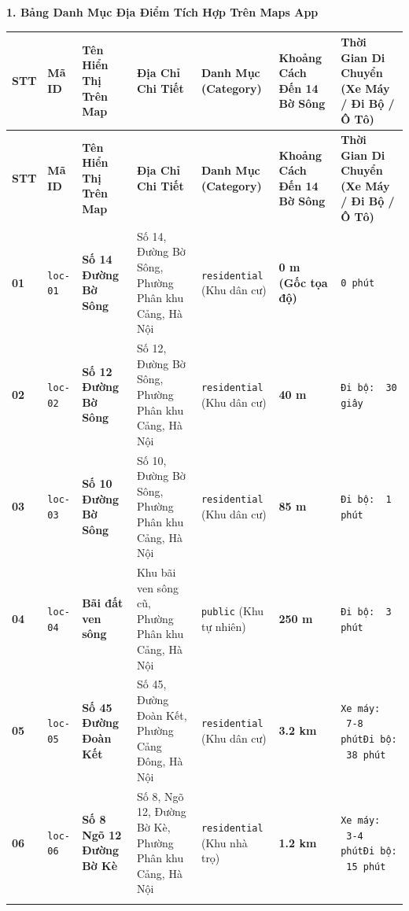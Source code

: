\documentclass[12pt,a4paper]{article}
\begin{document}
\vspace{0.3cm}\noindent\textbf{\large 1. Bảng Danh Mục Địa Điểm Tích Hợp Trên Maps App}\\[0.15cm]



\vspace{0.2cm}
\begingroup
\footnotesize
\begin{xltabular}{\textwidth}{C{0.6cm} C{1.1cm} L{2.2cm} L{2.8cm} L{2.0cm} C{1.8cm} >{\raggedright\arraybackslash}X}
\toprule
\textbf{STT} & \textbf{Mã ID} & \textbf{Tên Hiển Thị Trên Map} & \textbf{Địa Chỉ Chi Tiết} & \textbf{Danh Mục (Category)} & \textbf{Khoảng Cách Đến 14 Bờ Sông} & \textbf{Thời Gian Di Chuyển (Xe Máy / Đi Bộ / Ô Tô)} \\
\midrule
\endfirsthead
\toprule
\textbf{STT} & \textbf{Mã ID} & \textbf{Tên Hiển Thị Trên Map} & \textbf{Địa Chỉ Chi Tiết} & \textbf{Danh Mục (Category)} & \textbf{Khoảng Cách Đến 14 Bờ Sông} & \textbf{Thời Gian Di Chuyển (Xe Máy / Đi Bộ / Ô Tô)} \\
\midrule
\endhead
\bottomrule
\endfoot
\textbf{01} & \texttt{loc-01} & \textbf{Số 14 Đường Bờ Sông} & Số 14, Đường Bờ Sông, Phường Phân khu Cảng, Hà Nội & \texttt{residential} (Khu dân cư) & \textbf{0 m (Gốc tọa độ)} & \texttt{0 phút} \\ \addlinespace[4pt]
\textbf{02} & \texttt{loc-02} & \textbf{Số 12 Đường Bờ Sông} & Số 12, Đường Bờ Sông, Phường Phân khu Cảng, Hà Nội & \texttt{residential} (Khu dân cư) & \textbf{40 m} & \texttt{Đi bộ: ~30 giây} \\ \addlinespace[4pt]
\textbf{03} & \texttt{loc-03} & \textbf{Số 10 Đường Bờ Sông} & Số 10, Đường Bờ Sông, Phường Phân khu Cảng, Hà Nội & \texttt{residential} (Khu dân cư) & \textbf{85 m} & \texttt{Đi bộ: ~1 phút} \\ \addlinespace[4pt]
\textbf{04} & \texttt{loc-04} & \textbf{Bãi đất ven sông} & Khu bãi ven sông cũ, Phường Phân khu Cảng, Hà Nội & \texttt{public} (Khu tự nhiên) & \textbf{250 m} & \texttt{Đi bộ: ~3 phút} \\ \addlinespace[4pt]
\textbf{05} & \texttt{loc-05} & \textbf{Số 45 Đường Đoàn Kết} & Số 45, Đường Đoàn Kết, Phường Cảng Đông, Hà Nội & \texttt{residential} (Khu dân cư) & \textbf{3.2 km} & \texttt{Xe máy: ~7-8 phút}\newline \texttt{Đi bộ: ~38 phút} \\ \addlinespace[4pt]
\textbf{06} & \texttt{loc-06} & \textbf{Số 8 Ngõ 12 Đường Bờ Kè} & Số 8, Ngõ 12, Đường Bờ Kè, Phường Phân khu Cảng, Hà Nội & \texttt{residential} (Khu nhà trọ) & \textbf{1.2 km} & \texttt{Xe máy: ~3-4 phút}\newline \texttt{Đi bộ: ~15 phút} \\ \addlinespace[4pt]

\end{xltabular}
\end{document}
